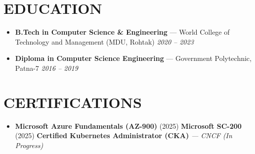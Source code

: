 \documentclass[a4paper,10pt]{article}
\begin{document}
\section{EDUCATION}
\begin{itemize}[leftmargin=0.0in, label={}, noitemsep, topsep=0.5pt, parsep=0.5pt, partopsep=0pt]
  \item \small \textbf{\color{navy}B.T\mbox{}ech in Computer Science \& Engineering} --- World College of Technology and Management (MDU, Rohtak) \hfill \textit{\small\color{soft}2020 -- 2023}
  \item \small \textbf{\color{navy}Diploma in Computer Science Engineering} --- Government Polytechnic, Patna-7 \hfill \textit{\small\color{soft}2016 -- 2019}
\end{itemize}

\section{CERTIFICATIONS}
\begin{itemize}[leftmargin=0.15in, label={\textcolor{accent}{\small\textbullet}}, noitemsep, topsep=0.5pt, parsep=0pt, partopsep=0pt]
  \item \small \textbf{Microsoft Azure Fundamentals (AZ-900)} (2025) \;\textbar\; \textbf{Microsoft SC-200} (2025) \;\textbar\; \textbf{Certified Kubernetes Administrator (CKA)} \textit{--- CNCF (In Progress)}
\end{itemize}
\end{document}
